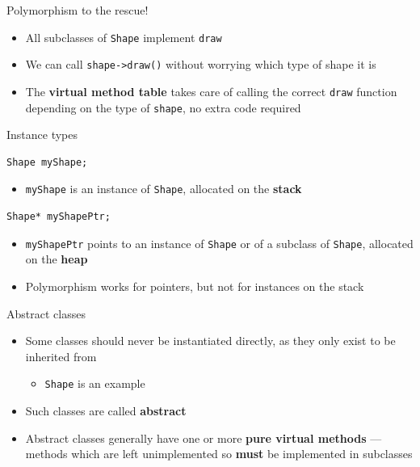 \begin{frame}{Polymorphism to the rescue!}
	\begin{itemize}
		\pause\item All subclasses of \lstinline{Shape} implement \lstinline{draw}
		\pause\item We can call \lstinline{shape->draw()} without worrying which type of shape it is
		\pause\item The \textbf{virtual method table} takes care of calling the correct
			\lstinline{draw} function depending on the type of \lstinline{shape},
			no extra code required
	\end{itemize}
\end{frame}

\begin{frame}[fragile]{Instance types}
	\pause
	\begin{lstlisting}
Shape myShape;
	\end{lstlisting}
	\begin{itemize}
		\pause\item \lstinline{myShape} is an instance of \lstinline{Shape}, allocated on the \textbf{stack}
	\end{itemize}
	\pause
	\begin{lstlisting}
Shape* myShapePtr;
	\end{lstlisting}
	\begin{itemize}
		\pause\item \lstinline{myShapePtr} points to an instance of \lstinline{Shape}
			or of a subclass of \lstinline{Shape}, allocated on the \textbf{heap}
		\pause\item Polymorphism works for pointers, but not for instances on the stack
	\end{itemize}
\end{frame}

\begin{frame}{Abstract classes}
\begin{itemize}
	\pause\item Some classes should never be instantiated directly, as they only exist to be inherited from
	\begin{itemize}
		\pause\item \lstinline{Shape} is an example
	\end{itemize}
	\pause\item Such classes are called \textbf{abstract}
	\pause\item Abstract classes generally have one or more \textbf{pure virtual methods} ---
		methods which are left unimplemented so \textbf{must} be implemented in subclasses
\end{itemize}
\end{frame}

